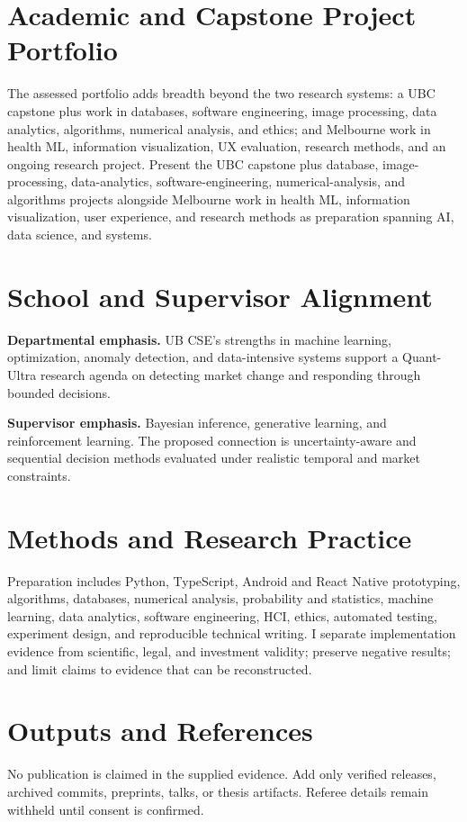 \documentclass[11pt]{article}
\begin{document}
\section*{Academic and Capstone Project Portfolio}
The assessed portfolio adds breadth beyond the two research systems: a UBC capstone plus work in databases, software engineering, image processing, data analytics, algorithms, numerical analysis, and ethics; and Melbourne work in health ML, information visualization, UX evaluation, research methods, and an ongoing research project. Present the UBC capstone plus database, image-processing, data-analytics, software-engineering, numerical-analysis, and algorithms projects alongside Melbourne work in health ML, information visualization, user experience, and research methods as preparation spanning AI, data science, and systems.

\section*{School and Supervisor Alignment}
\textbf{Departmental emphasis.} UB CSE's strengths in machine learning, optimization, anomaly detection, and data-intensive systems support a Quant-Ultra research agenda on detecting market change and responding through bounded decisions.

\textbf{Supervisor emphasis.} Bayesian inference, generative learning, and reinforcement learning. The proposed connection is uncertainty-aware and sequential decision methods evaluated under realistic temporal and market constraints.

\section*{Methods and Research Practice}
Preparation includes Python, TypeScript, Android and React Native prototyping, algorithms, databases, numerical analysis, probability and statistics, machine learning, data analytics, software engineering, HCI, ethics, automated testing, experiment design, and reproducible technical writing. I separate implementation evidence from scientific, legal, and investment validity; preserve negative results; and limit claims to evidence that can be reconstructed.

\section*{Outputs and References}
No publication is claimed in the supplied evidence. Add only verified releases, archived commits, preprints, talks, or thesis artifacts. Referee details remain withheld until consent is confirmed.
\end{document}
